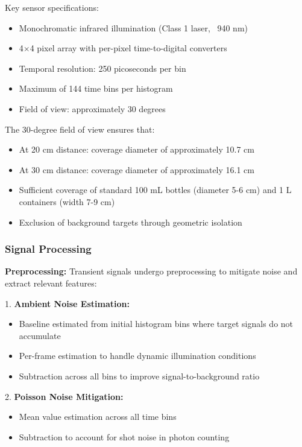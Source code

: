 \documentclass[11pt,a4paper]{article}
\begin{document}
\begin{enumerate}[leftmargin=*,label=\alph*)]
Key sensor specifications:
\begin{itemize}[leftmargin=*]
\item Monochromatic infrared illumination (Class 1 laser, ~940 nm)
\item 4$\times$4 pixel array with per-pixel time-to-digital converters
\item Temporal resolution: 250 picoseconds per bin
\item Maximum of 144 time bins per histogram
\item Field of view: approximately 30 degrees
\end{itemize}

The 30-degree field of view ensures that:
\begin{itemize}[leftmargin=*]
\item At 20 cm distance: coverage diameter of approximately 10.7 cm
\item At 30 cm distance: coverage diameter of approximately 16.1 cm
\item Sufficient coverage of standard 100 mL bottles (diameter 5-6 cm) and 1 L containers (width 7-9 cm)
\item Exclusion of background targets through geometric isolation
\end{itemize}

\subsubsection{Signal Processing}

\textbf{Preprocessing:}
Transient signals undergo preprocessing to mitigate noise and extract relevant features:

1. \textbf{Ambient Noise Estimation:}
\begin{itemize}[leftmargin=*]
\item Baseline estimated from initial histogram bins where target signals do not accumulate
\item Per-frame estimation to handle dynamic illumination conditions
\item Subtraction across all bins to improve signal-to-background ratio
\end{itemize}

2. \textbf{Poisson Noise Mitigation:}
\begin{itemize}[leftmargin=*]
\item Mean value estimation across all time bins
\item Subtraction to account for shot noise in photon counting
\end{itemize}


\end{enumerate}
\end{document}
